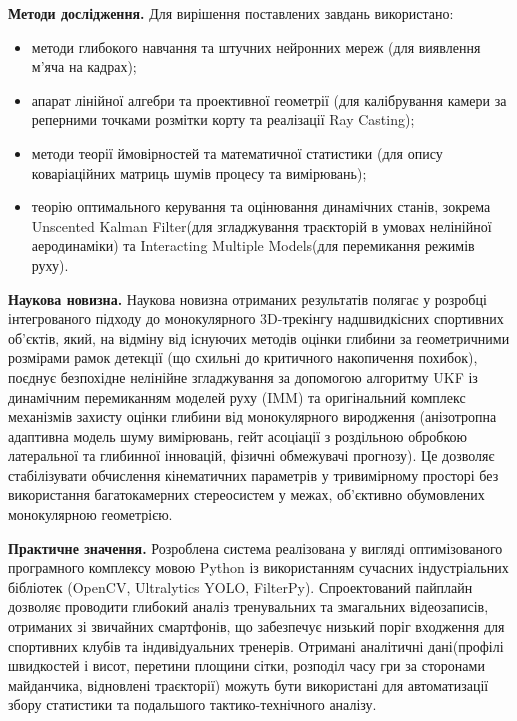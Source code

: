\begin{unnumbered}
\textbf{Методи дослідження. }
Для вирішення поставлених завдань використано:
\begin{itemize}
    \item методи глибокого навчання та штучних нейронних мереж (для виявлення м'яча
    на кадрах);
    \item апарат лінійної алгебри та проективної геометрії (для калібрування
    камери за реперними точками розмітки корту та реалізації Ray Casting);
    \item методи теорії ймовірностей та математичної статистики (для опису коваріаційних
    матриць шумів процесу та вимірювань);
    \item теорію оптимального керування та
    оцінювання динамічних станів, зокрема Unscented Kalman Filter(для
    згладжування траєкторій в умовах нелінійної аеродинаміки) та Interacting
    Multiple Models(для перемикання режимів руху).
\end{itemize}

\textbf{Наукова новизна. }
Наукова новизна отриманих результатів полягає у
розробці інтегрованого підходу до монокулярного 3D-трекінгу надшвидкісних
спортивних об'єктів, який, на відміну від існуючих методів оцінки глибини за
геометричними розмірами рамок детекції (що схильні до критичного
накопичення похибок), поєднує безпохідне нелінійне згладжування за
допомогою алгоритму \gls{UKF} із динамічним перемиканням моделей руху (\gls{IMM})
та оригінальний комплекс механізмів захисту оцінки глибини від монокулярного
виродження (анізотропна адаптивна модель шуму вимірювань, гейт асоціації з
роздільною обробкою латеральної та глибинної інновацій, фізичні обмежувачі
прогнозу). Це дозволяє стабілізувати обчислення кінематичних параметрів у
тривимірному просторі без використання багатокамерних стереосистем у межах,
об'єктивно обумовлених монокулярною геометрією.

\textbf{Практичне значення. }
Розроблена система реалізована у вигляді
оптимізованого програмного комплексу мовою Python із використанням
сучасних індустріальних бібліотек (OpenCV, Ultralytics YOLO, FilterPy).
Спроектований пайплайн дозволяє проводити глибокий аналіз тренувальних та
змагальних відеозаписів, отриманих зі звичайних смартфонів, що забезпечує
низький поріг входження для спортивних клубів та індивідуальних тренерів.
Отримані аналітичні дані(профілі швидкостей і висот, перетини площини сітки,
розподіл часу гри за сторонами майданчика, відновлені траєкторії) можуть бути
використані для автоматизації збору статистики та подальшого тактико-технічного
аналізу.

\end{unnumbered}

